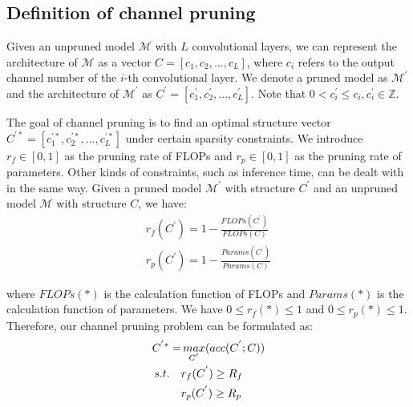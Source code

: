 \documentclass[final]{cvpr}
\begin{document}
\subsection{Definition of channel pruning}

Given an unpruned model $\mathcal{M}$ with $L$ convolutional layers, we can represent the architecture of $\mathcal{M}$ as a vector 
$C=[c_1, c_2,..., c_L]$, where $c_i$ refers to the output channel number of the $i$-th convolutional layer. We 
denote a pruned model as $\mathcal{M^{'}}$ and the architecture of $\mathcal{M^{'}}$ as $C^{'}=[c_{1}^{'}, c_{2}^{'},
..., c_{L}^{'}]$. Note that $0<c_{i}^{'} \leq c_{i}, c_{i}^{'} \in \mathbb{Z}$.

The goal of channel pruning is to find an optimal structure vector $C^{'*}=[c_{1}^{'*}, c_{2}^{'*},
..., c_{L}^{'*}]$ under certain sparsity constraints. 
We introduce $r_f \in [0,1]$ as the pruning rate of FLOPs and $r_p \in [0,1]$ 
as the pruning rate of parameters. Other kinds of constraints, such as inference time, can be dealt with in the same way. 
Given a pruned model $\mathcal{M^{'}}$ with structure $C^{'}$ and an unpruned model $\mathcal{M}$ with structure $C$, 
we have:
\begin{equation}
\begin{split}
    r_f(C^{'}) = 1 - \frac{FLOPs(C^{'})}{FLOPs(C)} \\
    r_p(C^{'}) = 1 - \frac{Params(C^{'})}{Params(C)}\label{eq1}
\end{split}
\end{equation}

\noindent where $FLOPs(*)$ is the calculation function of FLOPs and $Params(*)$ is the calculation function of parameters. We have $0 \leq r_f(*) \leq 1$ 
and $0 \leq r_p(*) \leq 1$. Therefore, our channel pruning problem can be formulated as:
\begin{align}
    C^{'*} = &\mathop{max} \limits_{C^{'}}(acc(C^{'};C)) \notag\\
    s.t. \quad &r_f(C^{'}) \geq R_{f} \notag\\
    &r_p(C^{'}) \geq R_{p} \label{eq2}
\end{align}
\end{document}
